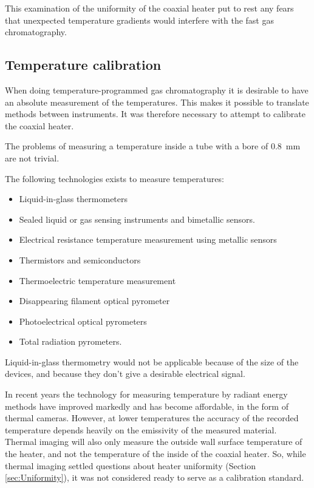 This examination of the uniformity of the coaxial heater put to rest any fears
that unexpected temperature gradients would interfere with the fast gas
chromatography.

\subsection{Temperature calibration}

When doing temperature-programmed gas chromatography it is desirable to have an
absolute measurement of the temperatures. This makes it possible to translate
methods between instruments. It was therefore necessary to attempt to calibrate
the coaxial heater.

The problems of measuring a temperature inside a tube with a bore of
\SI{0.8}{\milli\metre} are not trivial.

The following technologies exists to measure temperatures:
\begin{itemize}
	\item Liquid-in-glass thermometers
	\item Sealed liquid or gas sensing instruments and bimetallic sensors.
	\item Electrical resistance temperature measurement using metallic sensors
	\item Thermistors and semiconductors
	\item Thermoelectric temperature measurement
	\item Disappearing filament optical pyrometer
	\item Photoelectrical optical pyrometers
	\item Total radiation pyrometers.
\end{itemize}

Liquid-in-glass thermometry would not be applicable because of the size of the
devices, and because they don't give a desirable electrical signal. 

In recent years the technology for measuring temperature by radiant energy
methods have improved markedly and has become affordable, in the form of thermal
cameras. However, at lower temperatures the accuracy of the recorded temperature
depends heavily on the emissivity of the measured material. Thermal imaging will
also only measure the outside wall surface temperature of the heater, and not
the temperature of the inside of the coaxial heater. So, while thermal imaging
settled questions about heater uniformity (Section \ref{sec:Uniformity}), it was
not considered ready to serve as a calibration standard. 

